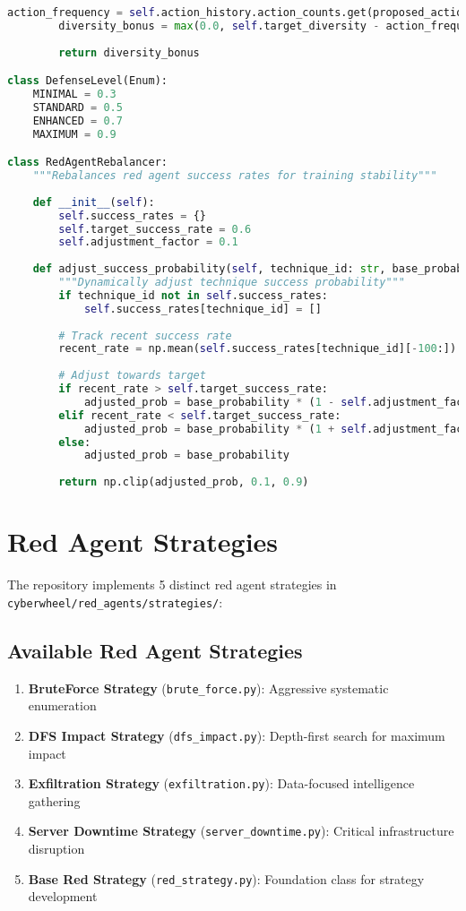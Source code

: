 \documentclass[12pt,a4paper]{article}
\begin{document}
\begin{lstlisting}[language=Python, caption=Critical Training Fixes]
        action_frequency = self.action_history.action_counts.get(proposed_action, 0) / total_actions
        diversity_bonus = max(0.0, self.target_diversity - action_frequency)
        
        return diversity_bonus

class DefenseLevel(Enum):
    MINIMAL = 0.3
    STANDARD = 0.5  
    ENHANCED = 0.7
    MAXIMUM = 0.9

class RedAgentRebalancer:
    """Rebalances red agent success rates for training stability"""
    
    def __init__(self):
        self.success_rates = {}
        self.target_success_rate = 0.6
        self.adjustment_factor = 0.1
        
    def adjust_success_probability(self, technique_id: str, base_probability: float) -> float:
        """Dynamically adjust technique success probability"""
        if technique_id not in self.success_rates:
            self.success_rates[technique_id] = []
            
        # Track recent success rate
        recent_rate = np.mean(self.success_rates[technique_id][-100:]) if self.success_rates[technique_id] else 0.5
        
        # Adjust towards target
        if recent_rate > self.target_success_rate:
            adjusted_prob = base_probability * (1 - self.adjustment_factor)
        elif recent_rate < self.target_success_rate:
            adjusted_prob = base_probability * (1 + self.adjustment_factor)
        else:
            adjusted_prob = base_probability
            
        return np.clip(adjusted_prob, 0.1, 0.9)
\end{lstlisting}

\section{Red Agent Strategies}

The repository implements 5 distinct red agent strategies in \texttt{cyberwheel/red\_agents/strategies/}:

\subsection{Available Red Agent Strategies}

\begin{enumerate}
    \item \textbf{BruteForce Strategy} (\texttt{brute\_force.py}): Aggressive systematic enumeration
    \item \textbf{DFS Impact Strategy} (\texttt{dfs\_impact.py}): Depth-first search for maximum impact
    \item \textbf{Exfiltration Strategy} (\texttt{exfiltration.py}): Data-focused intelligence gathering
    \item \textbf{Server Downtime Strategy} (\texttt{server\_downtime.py}): Critical infrastructure disruption
    \item \textbf{Base Red Strategy} (\texttt{red\_strategy.py}): Foundation class for strategy development
\end{enumerate}
\end{document}
